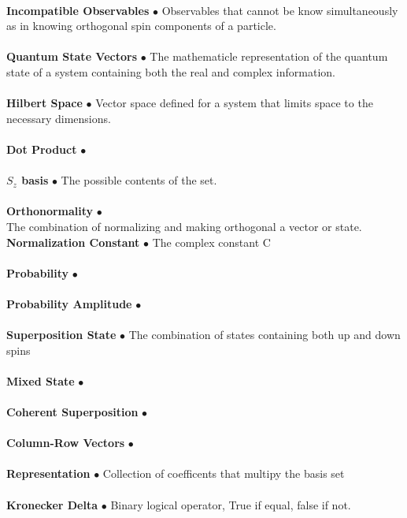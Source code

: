 \documentclass[paper=a4, fontsize=11pt]{scrartcl} %
\numberwithin{equation}{section} %
\numberwithin{figure}{section} %
\numberwithin{table}{section} %
\begin{document}
 \\
 \textbf{Incompatible Observables} $\bullet$  Observables that cannot be know simultaneously as in knowing orthogonal spin components of a particle.\\
 \\
 \textbf{Quantum State Vectors} $\bullet$ The mathematicle representation of the quantum state of a system containing both the real and complex information. \\
 \\
\textbf{Hilbert Space} $\bullet$ Vector space defined for a system that limits space to the necessary dimensions.\\
 \\
 \textbf{Dot Product} $\bullet$  \\
 \\
 \textbf{$S_z$ basis} $\bullet$ The possible contents of the set.\\
 \\
 \textbf{Orthonormality} $\bullet$ \\ The combination of normalizing and making orthogonal a vector or state.
 \\
\textbf{Normalization Constant} $\bullet$  The complex constant C\\
 \\
 \textbf{Probability} $\bullet$ \\
 \\
 \textbf{Probability Amplitude} $\bullet$ \\
 \\
 \textbf{Superposition State} $\bullet$ The combination of states containing both up and down spins\\
 \\
 \textbf{Mixed State} $\bullet$  \\
 \\
 \textbf{Coherent Superposition} $\bullet$ \\
 \\
 \textbf{Column-Row Vectors} $\bullet$ \\
 \\
 \textbf{Representation} $\bullet$ Collection of coefficents that multipy the basis set\\
 \\
 \textbf{Kronecker Delta} $\bullet$ Binary logical operator, True if equal, false if not.  \\
 \\
 
 
 
\end{document}
